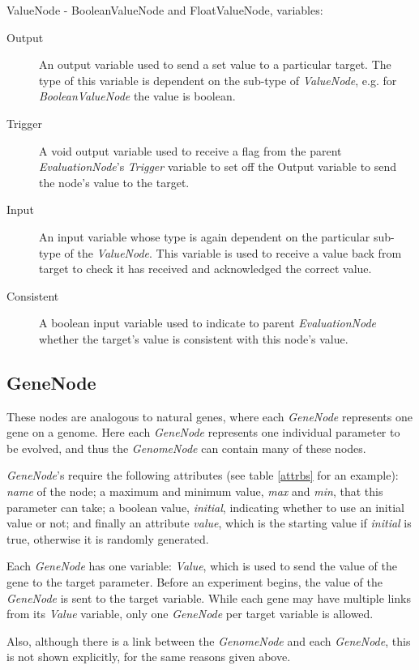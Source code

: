 \documentclass[10pt, notitlepage, a4paper]{article}
\begin{document}
\noindent ValueNode - BooleanValueNode and FloatValueNode, variables:
\begin{description}
\item[Output]An output variable used to send a set value to a particular target. The type of this variable is dependent on the sub-type of {\it ValueNode}, e.g. for {\it BooleanValueNode} the value is boolean.

\item[Trigger]A void output variable used to receive a flag from the parent {\it EvaluationNode}'s {\it Trigger} variable to set off the Output variable to send the node's value to the target.

\item[Input]An input variable whose type is again dependent on the particular sub-type of the {\it ValueNode}. This variable is used to receive a value back from target to check it has received and acknowledged the correct value.

\item[Consistent]A boolean input variable used to indicate to parent {\it EvaluationNode} whether the target's value is consistent with this node's value.
\end{description}


\subsection{GeneNode}
These nodes are analogous to natural genes, where each {\it GeneNode} represents one gene on a genome. Here each {\it GeneNode} represents one individual parameter to be evolved, and thus the {\it GenomeNode} can contain many of these nodes.

{\it GeneNode}'s require the following attributes (see table \ref{attrbs} for an example): {\it name} of the node; a maximum and minimum value, {\it max} and {\it min}, that this parameter can take; a boolean value, {\it initial}, indicating whether to use an initial value or not; and finally an attribute {\it value}, which is the starting value if {\it initial} is true, otherwise it is randomly generated.

Each {\it GeneNode} has one variable: {\it Value}, which is used to send the value of the gene to the target parameter. Before an experiment begins, the value of the {\it GeneNode} is sent to the target variable. While each gene may have multiple links from its {\it Value} variable, only one {\it GeneNode} per target variable is allowed.

Also, although there is a link between the {\it GenomeNode} and each {\it GeneNode}, this is not shown explicitly, for the same reasons given above.
\end{document}
